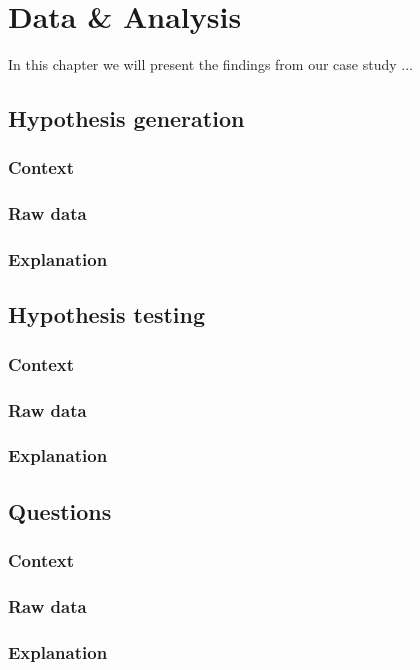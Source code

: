 \chapter{Data \& Analysis}
In this chapter we will present the findings from our case study ...

\section{Hypothesis generation}

\subsection{Context}
\subsection{Raw data}
\subsection{Explanation}

\section{Hypothesis testing}

\subsection{Context}
\subsection{Raw data}
\subsection{Explanation}

\section{Questions}

\subsection{Context}
\subsection{Raw data}
\subsection{Explanation}